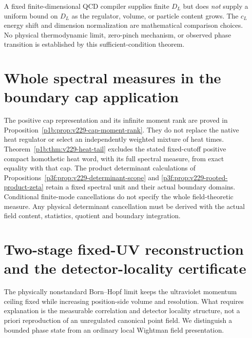 \documentclass[12pt,a4paper]{article}
\begin{document}
\begin{remark}
A fixed finite-dimensional QCD compiler supplies finite $D_L$ but does
\emph{not} supply a uniform bound on $D_L$ as the regulator, volume,
or particle content grows.  The $c_L$ energy shift and dimension
normalization are mathematical comparison choices.  No physical
thermodynamic limit, zero-pinch mechanism, or observed phase transition
is established by this sufficient-condition theorem.
\end{remark}

\printbibliography
\section{Whole spectral measures in the boundary cap application}
\label{p12:sec:v229-spectral-measure}
The positive cap representation and its infinite moment rank are proved
in Proposition~\ref{p1b:prop:v229-cap-moment-rank}. They do not replace
the native heat regulator or select an independently weighted mixture
of heat times. Theorem~\ref{p1b:thm:v229-heat-tail} excludes the stated
fixed-cutoff positive compact homothetic heat word, with its full
spectral measure, from exact equality with that cap.
The product determinant calculations of
Propositions~\ref{p3f:prop:v229-determinant-scope} and
\ref{p3f:prop:v229-rooted-product-zeta} retain a fixed spectral unit
and their actual boundary domains. Conditional finite-mode cancellations
do not specify the whole field-theoretic measure. Any physical
determinant cancellation must be derived with the actual field content,
statistics, quotient and boundary integration.


\clearpage
\section{Two-stage fixed-UV reconstruction and the detector-locality certificate}
\label{p12:sec:v350-reconstruction-repair}
The physically nonstandard Born--Hopf limit keeps the ultraviolet
momentum ceiling fixed while increasing position-side volume and
resolution. What requires explanation is the measurable correlation
and detector locality structure, not a priori reproduction of an
unregulated canonical point field. We distinguish a bounded phase
state from an ordinary local Wightman field presentation.
\end{document}
